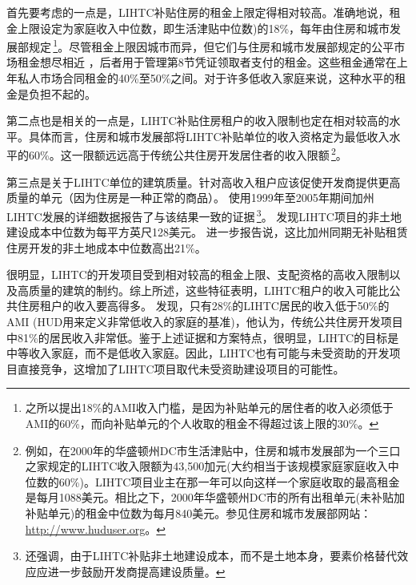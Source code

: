 \documentclass[lang=cn,11pt,a4paper]{paper}
\begin{document}
首先要考虑的一点是，LIHTC补贴住房的租金上限定得相对较高。准确地说，租金上限设定为家庭收入中位数，即生活津贴中位数)的18\%，每年由住房和城市发展部规定\,\footnote{之所以提出18\%的AMI收入门槛，是因为补贴单元的居住者的收入必须低于AMI的60\%，而向补贴单元的个人收取的租金不得超过该上限的30\%。}。尽管租金上限因城市而异，但它们与住房和城市发展部规定的公平市场租金想尽相近 \citep{Cummings1999257}，后者用于管理第8节凭证领取者支付的租金。这些租金通常在上年私人市场合同租金的40\%至50\%之间。对于许多低收入家庭来说，这种水平的租金是负担不起的。

第二点也是相关的一点是，LIHTC补贴住房租户的收入限制也定在相对较高的水平。具体而言，住房和城市发展部将LIHTC补贴单位的收入资格定为最低收入水平的60\%。这一限额远远高于传统公共住房开发居住者的收入限额\,\footnote{例如，在2000年的华盛顿州DC市生活津贴中，住房和城市发展部为一个三口之家规定的LIHTC收入限额为43,500加元(大约相当于该规模家庭家庭收入中位数的60\%)。LIHTC项目业主在那一年可以向这样一个家庭收取的最高租金是每月1088美元。相比之下，2000年华盛顿州DC市的所有出租单元(未补贴加补贴单元)的租金中位数为每月840美元。参见住房和城市发展部网站：\url{http://www.huduser.org}。}。

第三点是关于LIHTC单位的建筑质量。针对高收入租户应该促使开发商提供更高质量的单元（因为住房是一种正常的商品）。\cite{Eriksen2009141} 使用1999年至2005年期间加州LIHTC发展的详细数据报告了与该结果一致的证据\,\footnote{\cite{Eriksen2009141} 还强调，由于LIHTC补贴非土地建设成本，而不是土地本身，要素价格替代效应应进一步鼓励开发商提高建设质量。}。\cite{Eriksen2009141} 发现LIHTC项目的非土地建设成本中位数为每平方英尺128美元。\cite{Eriksen2009141} 进一步报告说，这比加州同期无补贴租赁住房开发的非土地成本中位数高出21\%。

很明显，LIHTC的开发项目受到相对较高的租金上限、支配资格的高收入限制以及高质量的建筑的制约。综上所述，这些特征表明，LIHTC租户的收入可能比公共住房租户的收入要高得多。\cite{Wallace1995785} 发现，只有28\%的LIHTC居民的收入低于50\%的AMI (HUD用来定义非常低收入的家庭的基准)，他认为，传统公共住房开发项目中81\%的居民收入非常低。鉴于上述证据和方案特点，很明显，LIHTC的目标是中等收入家庭，而不是低收入家庭。因此，LIHTC也有可能与未受资助的开发项目直接竞争，这增加了LIHTC项目取代未受资助建设项目的可能性。
\end{document}
